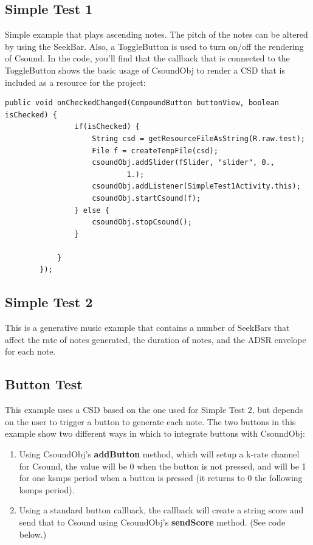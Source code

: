 \documentclass[11pt]{article}
\begin{document}
\subsection{Simple Test 1}

Simple example that plays ascending notes.  The pitch of the notes can be altered by using the SeekBar.  Also, a ToggleButton is used to turn on/off the rendering of Csound.  In the code, you'll find that the callback that is connected to the ToggleButton shows the basic usage of CsoundObj to render a CSD that is included as a resource for the project:

\begin{lstlisting}[caption=Example code showing configuring and starting a CsoundObj]
public void onCheckedChanged(CompoundButton buttonView, boolean isChecked) {
				if(isChecked) {
					String csd = getResourceFileAsString(R.raw.test);
					File f = createTempFile(csd);
					csoundObj.addSlider(fSlider, "slider", 0.,
							1.);
					csoundObj.addListener(SimpleTest1Activity.this);
					csoundObj.startCsound(f);
				} else {
					csoundObj.stopCsound();
				}
				
			}
		});
\end{lstlisting}

\subsection{Simple Test 2}

This is a generative music example that contains a number of SeekBars that affect the rate of notes generated, the duration of notes, and the ADSR envelope for each note. 


\subsection{Button Test}

This example uses a CSD based on the one used for Simple Test 2, but depends on the user to trigger a button to generate each note.  The two buttons in this example show two different ways in which to integrate buttons with CsoundObj:

\begin{enumerate}
\item Using CsoundObj's \textbf{addButton} method, which will setup a k-rate channel for Csound, the value will be 0 when the button is not pressed, and will be 1 for one ksmps period when a button is pressed (it returns to 0 the following ksmps period). 
\item Using a standard button callback, the callback will create a string score and send that to Csound using CsoundObj's \textbf{sendScore} method. (See code below.)
\end{enumerate}
\end{document}
